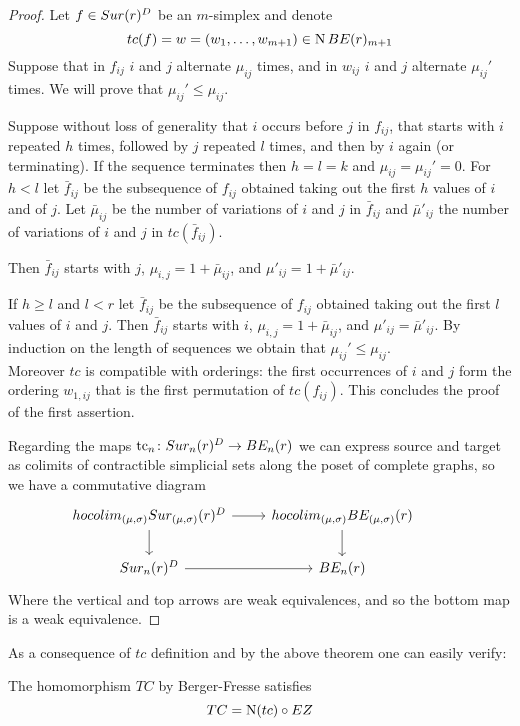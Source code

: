 \begin{proof}
	Let $f\in Sur(r)^{D}$ be an $m$-simplex and denote
	$$tc(f)=w=(w_{1},\dots,w_{m+1})\in \operatorname{N}BE(r)_{m+1}$$
	Suppose that in $f_{ij}$ $i$ and $j$ alternate $\mu_{ij}$ times, and in $w_{ij}$ $i$ and $j$ alternate $\mu_{ij}'$ times.
	We will prove that
	$\mu_{ij}' \leq \mu_{ij}$.

	Suppose without loss of generality that $i$ occurs before $j$ in $f_{ij}$, that starts with $i$ repeated $h$ times, followed by $j$ repeated $l$ times, and
	then by $i$ again (or terminating).
	If the sequence terminates then $h=l=k$ and $\mu_{ij}=\mu_{ij}'=0$.
	For $h <l$
	let $\bar{f}_{ij}$ be the subsequence of $f_{ij}$
	obtained taking out the first $h$ values of $i$ and of $j$.
	Let $\bar{\mu}_{ij}$ be the number of variations of $i$ and $j$ in $\bar{f}_{ij}$
	and $\bar{\mu}'_{ij}$ the number of variations of $i$ and $j$ in $tc(\bar{f}_{ij})$.

	Then $\bar{f}_{ij}$
	starts with $j$,
	$\mu_{i,j}=1+\bar{\mu}_{ij}$,
	and $\mu'_{ij}=1+\bar{\mu}'_{ij}$.

	If $h \geq l$ and $l<r$
	let $\bar{f}_{ij}$ be the subsequence of $f_{ij}$ obtained taking out the first $l$ values of $i$ and $j$.
	Then $\bar{f}_{ij}$
	starts with $i$,
	$\mu_{i,j}=1+\bar{\mu}_{ij}$,
	and $\mu'_{ij}=\bar{\mu}'_{ij}$.
	By induction on the length of sequences we obtain that
	$\mu_{ij}'\le \mu_{ij}$.\\
	Moreover $tc$ is compatible with orderings: the first occurrences of $i$ and $j$ form the ordering $w_{1,ij}$ that is the first permutation of $tc(f_{ij})$.
	This concludes the proof of the first assertion.

	Regarding the maps $\operatorname{tc}_{n} \colon Sur_{n}(r)^{D}\rightarrow BE_{n}(r)$ we can express source and target as colimits of contractible %
	simplicial sets along the poset of complete graphs,
	so we have a commutative diagram
	\begin{equation*}
		\begin{tikzcd}			hocolim_{(\mu,\sigma)}\sur_{(\mu,\sigma)}(r)^{D} \arrow[r] \arrow[d]& hocolim_{(\mu,\sigma)}\BE_{(\mu,\sigma)}(r) \arrow[d] \\
			\sur_{n}(r)^{D}\arrow[r] & \BE_{n}(r)&
		\end{tikzcd}
	\end{equation*}
	Where the vertical and top arrows
	are weak equivalences, and so the bottom map is a weak equivalence.
\end{proof}
As a consequence of $tc$ definition and by the above theorem one can easily verify:
\begin{proposition}
    The homomorphism $TC$ by Berger-Fresse satisfies $$TC=\operatorname{N}(tc)\circ EZ $$
\end{proposition}

